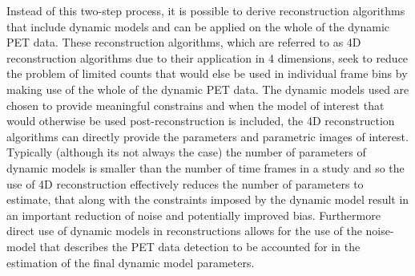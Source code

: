 Instead of this two-step process, it is possible to derive reconstruction algorithms that include dynamic models and can be applied on the whole of the dynamic PET data. These reconstruction algorithms, which are referred to as 4D reconstruction algorithms due to their application in 4 dimensions, seek to reduce the problem of limited counts that would else be used in individual frame bins by making use of the whole of the dynamic PET data. The dynamic models used are chosen to provide meaningful constrains and when the model of interest that would otherwise be used post-reconstruction is included, the 4D reconstruction algorithms can directly provide the parameters and parametric images of interest. 
Typically (although its not always the case) the number of parameters of dynamic models is smaller than the number of time frames in a study and so the use of 4D reconstruction effectively reduces the number of parameters to estimate, that along with the constraints imposed by the dynamic model result in an important reduction of noise and potentially improved bias. Furthermore direct use of dynamic models in reconstructions allows for the use of the noise-model that describes the PET data detection to be accounted for in the estimation of the final dynamic model parameters. 

